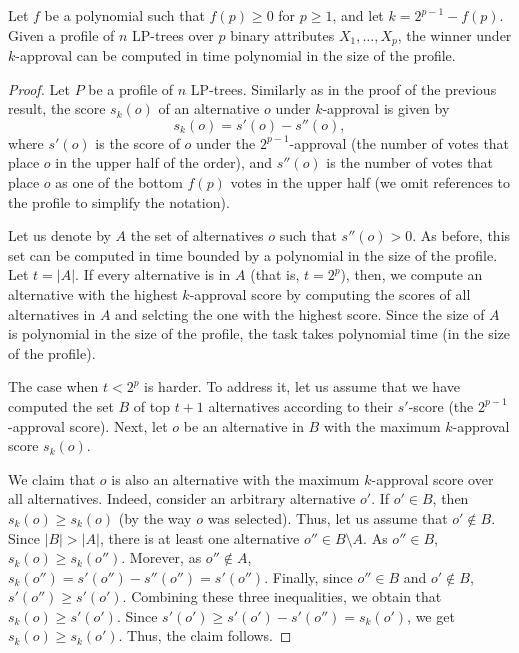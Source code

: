 
\begin{thm}
\label{thm2}
Let $f$ be a polynomial such that $f(p)\geq 0$ for $p\geq 1$, and let
$k=2^{p-1}-f(p)$. Given a profile of $n$ LP-trees over $p$ binary attributes 
$X_1,\ldots,X_p$, the winner under $k$-approval can be computed in time 
polynomial in the size of the profile.
\end{thm}
\begin{proof}
Let $P$ be a profile of $n$ LP-trees. Similarly as in the proof of the
previous result, the score $s_k(o)$ of an alternative $o$ under 
$k$-approval is given by
\[
s_k(o) = s'(o)-s''(o),
\]
where $s'(o)$ is the score of $o$ under the $2^{p-1}$-approval (the number
of votes that place $o$ in the upper half of the order), and $s''(o)$ is the
number of votes that place $o$ as one of the bottom $f(p)$ votes in the upper
half (we omit references to the profile to simplify the notation).

Let us denote by $A$ the set of alternatives $o$ such that $s''(o)>0$.
As before, this set can be computed in time bounded by a polynomial in 
the size of the profile. Let $t=|A|$. If every alternative is in $A$
(that is, $t=2^p$), then, we compute an alternative with the highest
$k$-approval score by computing the scores of all alternatives in $A$
and selcting the one with the highest score. Since the size of $A$ is
polynomial in the size of the profile, the task takes polynomial time
(in the size of the profile).

The case when $t< 2^p$ is harder. To address it, let us assume that we 
have computed the set $B$ of top $t+1$ alternatives according to their 
$s'$-score (the $2^{p-1}$-approval score). Next, let $o$ be an alternative 
in $B$ with the maximum $k$-approval score $s_k(o)$.

We claim that $o$ is also an alternative with the maximum $k$-approval 
score over all alternatives. Indeed, consider an arbitrary alternative 
$o'$. If $o'\in B$, then $s_k(o)\geq s_k(o)$ (by the way $o$ was selected). 
Thus, let us assume that $o'\notin B$. Since $|B|> |A|$, there is at least 
one alternative $o''\in B\setminus A$. As $o''\in B$, $s_k(o)\geq s_k(o'')$.
Morever, as $o''\notin A$, $s_k(o'')=s'(o'')-s''(o'')=s'(o'')$. Finally,
since $o''\in B$ and $o'\notin B$, $s'(o'')\geq s'(o')$. Combining these 
three inequalities, we obtain that $s_k(o) \geq s'(o')$. Since $s'(o')\geq 
s'(o')-s'(o'')=s_k(o')$, we get $s_k(o)\geq s_k(o')$. Thus, the claim follows.


\end{proof}

